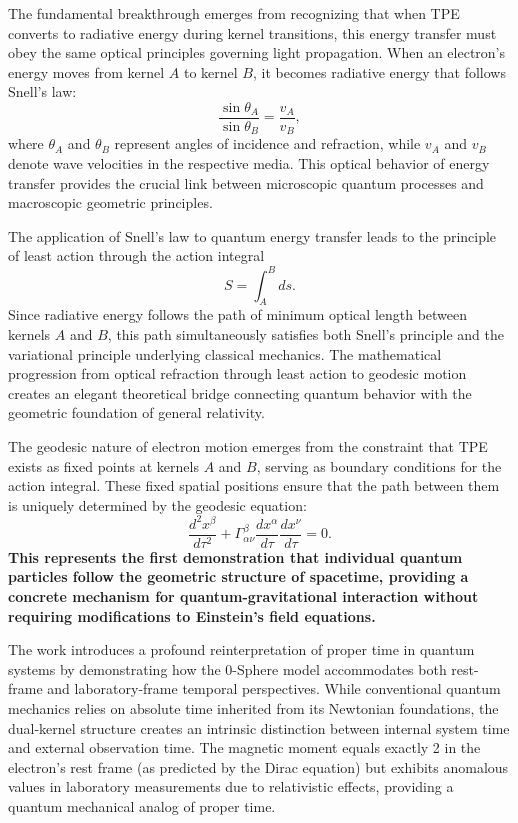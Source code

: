 \documentclass[%
 reprint,
 amsmath,amssymb,
 aps,
]{revtex4-1}
\numberwithin{equation}{section}%
\begin{document}
The fundamental breakthrough emerges from recognizing that when TPE converts to radiative energy during kernel transitions, this energy transfer must obey the same optical principles governing light propagation. When an electron's energy moves from kernel $A$ to kernel $B$, it becomes radiative energy that follows Snell's law:
\begin{equation}
\frac{\sin\theta_A}{\sin\theta_B} = \frac{v_A}{v_B},
\end{equation}
where $\theta_A$ and $\theta_B$ represent angles of incidence and refraction, while $v_A$ and $v_B$ denote wave velocities in the respective media. This optical behavior of energy transfer provides the crucial link between microscopic quantum processes and macroscopic geometric principles.

The application of Snell's law to quantum energy transfer leads to the principle of least action through the action integral
\begin{equation}
S = \int_A^B ds.
\end{equation}
Since radiative energy follows the path of minimum optical length between kernels $A$ and $B$, this path simultaneously satisfies both Snell's principle and the variational principle underlying classical mechanics. The mathematical progression from optical refraction through least action to geodesic motion creates an elegant theoretical bridge connecting quantum behavior with the geometric foundation of general relativity.

The geodesic nature of electron motion emerges from the constraint that TPE exists as fixed points at kernels $A$ and $B$, serving as boundary conditions for the action integral. These fixed spatial positions ensure that the path between them is uniquely determined by the geodesic equation: 
\begin{equation}
\frac{d^2x^\beta}{d\tau^2} + \Gamma^\beta_{\alpha\nu}\frac{dx^\alpha}{d\tau}\frac{dx^\nu}{d\tau} = 0.
\end{equation}
\textbf{This represents the first demonstration that individual quantum particles follow the geometric structure of spacetime, providing a concrete mechanism for quantum-gravitational interaction without requiring modifications to Einstein's field equations.}

The work introduces a profound reinterpretation of proper time in quantum systems by demonstrating how the 0-Sphere model accommodates both rest-frame and laboratory-frame temporal perspectives. While conventional quantum mechanics relies on absolute time inherited from its Newtonian foundations, the dual-kernel structure creates an intrinsic distinction between internal system time and external observation time. The magnetic moment equals exactly 2 in the electron's rest frame (as predicted by the Dirac equation) but exhibits anomalous values in laboratory measurements due to relativistic effects, providing a quantum mechanical analog of proper time.
\end{document}

